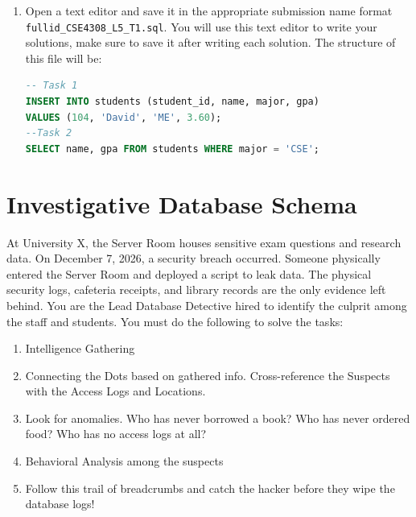 \documentclass[12pt,a4paper]{article}
\begin{document}
\begin{enumerate}
After loading the SQL file, reconnect to PostgreSQL to verify that the tables have been created.

1. Reconnect to Your Database:

   \begin{lstlisting}[language=SQL]
   psql -h localhost -U student_12345 -d cse4308_12345
   \end{lstlisting}

2. Check Tables:

   Verify the tables have been created by listing them:

   \begin{lstlisting}[language=SQL]
   \dt
   \end{lstlisting}

3. View Table Data:

   Verify the data by running the following SQL queries:

   \begin{lstlisting}[language=SQL]
   SELECT * FROM <table_name>;
   \end{lstlisting}

\item Open a text editor and save it in the appropriate submission name format \\ \texttt{fullid\_CSE4308\_L5\_T1.sql}. You will use this text editor to write your solutions, make sure to save it after writing each solution. The structure of this file will be:
\begin{lstlisting}[language=SQL]
-- Task 1
INSERT INTO students (student_id, name, major, gpa)
VALUES (104, 'David', 'ME', 3.60);
--Task 2
SELECT name, gpa FROM students WHERE major = 'CSE';
\end{lstlisting}
\end{enumerate}
\newpage

\newpage
\section{Investigative Database Schema}

At University X, the Server Room houses sensitive exam questions and research data. On December 7, 2026, a security breach occurred. Someone physically entered the Server Room and deployed a script to leak data. The physical security logs, cafeteria receipts, and library records are the only evidence left behind. You are the Lead Database Detective hired to identify the culprit among the staff and students. You must do the following to solve the tasks:
\begin{enumerate}
    \item Intelligence Gathering
    \item Connecting the Dots based on gathered info. Cross-reference the Suspects with the Access Logs and Locations.
    \item Look for anomalies. Who has never borrowed a book? Who has never ordered food? Who has no access logs at all?
    \item Behavioral Analysis among the suspects
    \item Follow this trail of breadcrumbs and catch the hacker before they wipe the database logs!
\end{enumerate}
\end{document}
